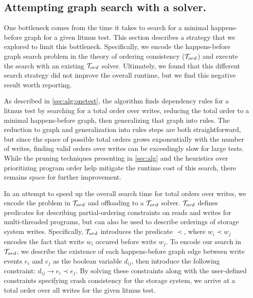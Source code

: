 \subsection{Attempting graph search with a \tord solver.}
One bottleneck \depsynth
comes from the time it takes to search for a minimal
happens-before graph for a given litmus test.
This section describes a strategy that we explored to limit this bottleneck.
Specifically, we encode the happens-before graph search problem
in the theory of ordering consistency ($\mathcal{T}_{ord}$) \cite{n:tord}
and execute the search with an existing $\mathcal{T}_{ord}$ solver.
Ultimately, we found that this different search strategy did not 
improve the overall runtime, but we find this negative
result worth reporting.

As described in \cref{sec:alg:onetest}, the  algorithm
finds dependency rules for a litmus test by searching for a total order over writes,
reducing the total order to a minimal happens-before graph,
then generalizing that graph into rules.
The reduction to graph and generalization into rules steps are both straightforward,
but since the space of possible total orders grows exponentially with the number of writes,
finding valid orders over writes can be exceedingly slow for large tests.
While the pruning techniques presenting in \cref{sec:alg}
and the heuristics over prioritizing program order help mitigate the runtime cost of this search,
there remains space for further improvement.

In an attempt to speed up the overall search time for total orders over writes,
we encode the problem in $\mathcal{T}_{ord}$ and offloading to a $\mathcal{T}_{ord}$ solver.
$\mathcal{T}_{ord}$ defines predicates for describing partial-ordering constraints
on reads and writes for multi-threaded programs, %
but can also be used to describe orderings of storage system writes.
Specifically, $\mathcal{T}_{ord}$ introduces the predicate $\prec$, where
$ w_i \prec w_j $ encodes the fact that write $w_i$ occured before
write $w_j$.
To encode our search in $\mathcal{T}_{ord}$,
we describe the existence of each happens-before graph edge
between write events $e_i$ and $e_j$ as the boolean variable $d_{ij}$,
then introduce the following constraint: $ d_{ij} \rightarrow e_i \prec e_j $.
By solving these constraints along with the user-defined constraints specifying
crash consistency for the storage system, we arrive at a total order over all
writes for the given litmus test.

